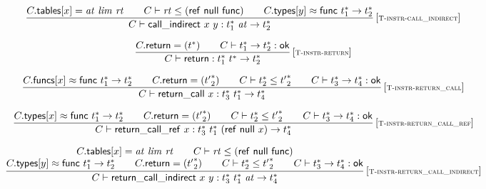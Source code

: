 $$
\begin{array}{@{}c@{}}\displaystyle
\frac{
C{.}\mathsf{tables}{}[x] = {\mathit{at}}~{\mathit{lim}}~{\mathit{rt}}
 \qquad
C \vdash {\mathit{rt}} \leq (\mathsf{ref}~\mathsf{null}~\mathsf{func})
 \qquad
C{.}\mathsf{types}{}[y] \approx \mathsf{func}~{t_1^\ast} \rightarrow {t_2^\ast}
}{
C \vdash \mathsf{call\_indirect}~x~y : {t_1^\ast}~{\mathit{at}} \rightarrow {t_2^\ast}
} \, {[\textsc{\scriptsize T{-}instr{-}call\_indirect}]}
\qquad
\end{array}
$$

$$
\begin{array}{@{}c@{}}\displaystyle
\frac{
C{.}\mathsf{return} = ({t^\ast})
 \qquad
C \vdash {t_1^\ast} \rightarrow {t_2^\ast} : \mathsf{ok}
}{
C \vdash \mathsf{return} : {t_1^\ast}~{t^\ast} \rightarrow {t_2^\ast}
} \, {[\textsc{\scriptsize T{-}instr{-}return}]}
\qquad
\end{array}
$$

$$
\begin{array}{@{}c@{}}\displaystyle
\frac{
C{.}\mathsf{funcs}{}[x] \approx \mathsf{func}~{t_1^\ast} \rightarrow {t_2^\ast}
 \qquad
C{.}\mathsf{return} = ({{t'}_2^\ast})
 \qquad
C \vdash {t_2^\ast} \leq {{t'}_2^\ast}
 \qquad
C \vdash {t_3^\ast} \rightarrow {t_4^\ast} : \mathsf{ok}
}{
C \vdash \mathsf{return\_call}~x : {t_3^\ast}~{t_1^\ast} \rightarrow {t_4^\ast}
} \, {[\textsc{\scriptsize T{-}instr{-}return\_call}]}
\qquad
\end{array}
$$

$$
\begin{array}{@{}c@{}}\displaystyle
\frac{
C{.}\mathsf{types}{}[x] \approx \mathsf{func}~{t_1^\ast} \rightarrow {t_2^\ast}
 \qquad
C{.}\mathsf{return} = ({{t'}_2^\ast})
 \qquad
C \vdash {t_2^\ast} \leq {{t'}_2^\ast}
 \qquad
C \vdash {t_3^\ast} \rightarrow {t_4^\ast} : \mathsf{ok}
}{
C \vdash \mathsf{return\_call\_ref}~x : {t_3^\ast}~{t_1^\ast}~(\mathsf{ref}~\mathsf{null}~x) \rightarrow {t_4^\ast}
} \, {[\textsc{\scriptsize T{-}instr{-}return\_call\_ref}]}
\qquad
\end{array}
$$

$$
\begin{array}{@{}c@{}}\displaystyle
\frac{
\begin{array}{@{}c@{}}
C{.}\mathsf{tables}{}[x] = {\mathit{at}}~{\mathit{lim}}~{\mathit{rt}}
 \qquad
C \vdash {\mathit{rt}} \leq (\mathsf{ref}~\mathsf{null}~\mathsf{func})
 \\
C{.}\mathsf{types}{}[y] \approx \mathsf{func}~{t_1^\ast} \rightarrow {t_2^\ast}
 \qquad
C{.}\mathsf{return} = ({{t'}_2^\ast})
 \qquad
C \vdash {t_2^\ast} \leq {{t'}_2^\ast}
 \qquad
C \vdash {t_3^\ast} \rightarrow {t_4^\ast} : \mathsf{ok}
\end{array}
}{
C \vdash \mathsf{return\_call\_indirect}~x~y : {t_3^\ast}~{t_1^\ast}~{\mathit{at}} \rightarrow {t_4^\ast}
} \, {[\textsc{\scriptsize T{-}instr{-}return\_call\_indirect}]}
\qquad
\end{array}
$$

